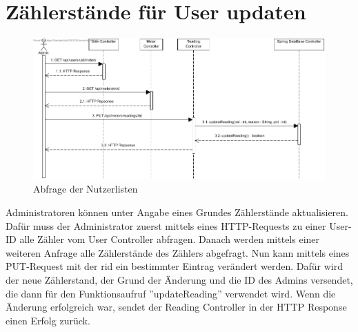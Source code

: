 \section{Zählerstände für User updaten}
\begin{figure}[H]
	\centering
	\includegraphics[width = 15cm]{img/diagrams/ChangeReading}
	\caption{Abfrage der Nutzerlisten}
\end{figure}
Administratoren können unter Angabe eines Grundes Zählerstände aktualisieren.
Dafür muss der Administrator zuerst mittels eines HTTP-Requests zu einer User-ID alle Zähler vom User Controller abfragen. Danach werden mittels einer weiteren Anfrage alle Zählerstände des Zählers abgefragt. Nun kann mittels eines PUT-Request mit der rid ein bestimmter Eintrag verändert werden. Dafür wird der neue Zählerstand, der Grund der Änderung und die ID des Admins versendet, die dann für den Funktionsaufruf ''updateReading'' verwendet wird. Wenn die Änderung erfolgreich war, sendet der Reading Controller in der HTTP Response einen Erfolg zurück.